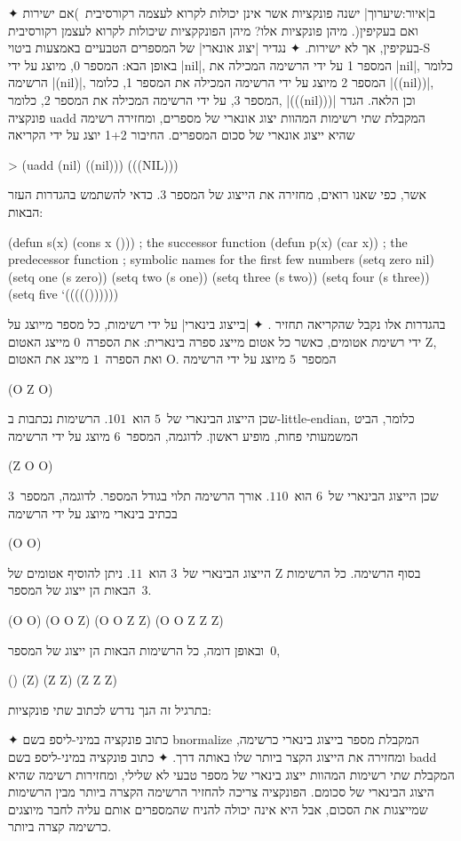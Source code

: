 \begin{enumerate}
✦ ב|איור:שיערוך| ישנה פונקציות אשר אינן יכולות לקרוא לעצמה
רקורסיבית~)אם ישירות ואם בעקיפין(. מיהן פונקציות אלו? מיהן
הפונקקציות שיכולות לקרוא לעצמן רקורסיבית בעקיפין, אך לא ישירות.
✦ נגדיר
\ע|יצוג אונארי| של המספרים הטבעיים באמצעות ביטוי-S באופן הבא: המספר
0,
מיוצג על ידי \E|nil|, המספר 1 על ידי הרשימה המכילה את \E|nil|, כלומר הרשימה
\E|(nil)|, המספר 2 מיוצג על ידי הרשימה המכילה את המספר 1, כלומר \E|((nil))|,
המספר 3, על ידי הרשימה המכילה את המספר 2, כלומר, \E|(((nil)))| וכן הלאה.
הגדר פונקציה uadd המקבלת שתי רשימות המהוות יצוג אונארי של מספרים, ומחזירה
רשימה שהיא ייצוג אונארי של סכום המספרים. החיבור 1+2 יוצג על ידי הקריאה
\begin{LISP}
> (uadd (nil) ((nil)))
(((NIL)))
\end{LISP}
אשר, כפי שאנו רואים, מחזירה את הייצוג של המספר 3.
כדאי להשתמש בהגדרות העזר הבאות:
\begin{LISP}
(defun s(x) (cons x ())) ; the successor function
(defun p(x) (car x)) ; the predecessor function
; symbolic names for the first few numbers
(setq zero nil)
(setq one (s zero))
(setq two (s one))
(setq three (s two))
(setq four (s three))
(setq five ‘((((())))))
\end{LISP}
בהגדרות אלו נקבל שהקריאה
תחזיר \lisp{((((()))))}.
✦ \ע|בייצוג בינארי| על ידי רשימות, כל מספר מייוצג על ידי רשימת אטומים, כאשר כל
אטום מייצג ספרה בינארית: את הספרה~$0$ מייצג האטום Z, ואת הספרה~$1$ מייצג את
האטום O. המספר~$5$ מיוצג על ידי הרשימה \begin{LISP}
(O Z O)
\end{LISP} שכן הייצוג הבינארי של~$5$ הוא~$101$. הרשימות נכתבות ב-little-endian,
כלומר, הביט המשמעותי פחות, מופיע ראשון. לדוגמה, המספר~$6$ מיוצג על ידי הרשימה
\begin{LISP}
 (Z O O)
 \end{LISP} שכן הייצוג הבינארי של~$6$ הוא~$110$. אורך הרשימה תלוי בגודל המספר.
 לדוגמה, המספר~$3$ בכתיב בינארי מיוצג על ידי הרשימה \begin{LISP}
 (O O)
 \end{LISP} הייצוג הבינארי של~$3$ הוא~$11$. ניתן להוסיף אטומים של Z בסוף
 הרשימה. כל הרשימות הבאות הן ייצוג של המספר~$3$. \begin{LISP}
(O O)
(O O Z)
(O O Z Z)
(O O Z Z Z)
\end{LISP}
 ובאופן דומה, כל הרשימות הבאות הן ייצוג של המספר~$0$,
\begin{LISP}
()
(Z)
(Z Z)
(Z Z Z)
\end{LISP}
בתרגיל זה הנך נדרש לכתוב שתי פונקציות:
\begin{itemize}
    ✦ כתוב פונקציה במיני-ליספ בשם bnormalize המקבלת מספר בייצוג בינארי כרשימה,
    ומחזירה את הייצוג הקצר ביותר שלו באותה דרך.
     ✦ כתוב פונקציה במיני-ליספ בשם badd המקבלת שתי רשימות המהוות ייצוג בינארי
     של מספר טבעי לא שלילי, ומחזירות רשימה שהיא היצוג הבינארי של סכומם.
     הפונקציה צריכה להחזיר הרשימה הקצרה ביותר מבין הרשימות שמייצגות את הסכום,
     אבל היא אינה יכולה להניח שהמספרים אותם עליה לחבר מיוצגים כרשימה קצרה
     ביותר.
\end{itemize}
\end{enumerate}
